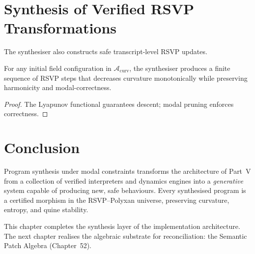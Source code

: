 \section{Synthesis of Verified RSVP Transformations}
\label{sec:51:rsvp-synthesis}

The synthesiser also constructs safe transcript-level RSVP updates.

\begin{theorem}
For any initial field configuration in $\mathcal{A}_{\mathrm{curv}}$, the
synthesiser produces a finite sequence of RSVP steps that decreases curvature
monotonically while preserving harmonicity and modal-correctness.
\end{theorem}

\begin{proof}
The Lyapunov functional guarantees descent; modal pruning enforces correctness.  
\end{proof}


\section{Conclusion}
\label{sec:51:conclusion}

Program synthesis under modal constraints transforms the architecture of Part~V
from a collection of verified interpreters and dynamics engines into a
\emph{generative} system capable of producing new, safe behaviours.
Every synthesised program is a certified morphism in the RSVP--Polyxan universe,
preserving curvature, entropy, and quine stability.

This chapter completes the synthesis layer of the implementation architecture.
The next chapter realises the algebraic substrate for reconciliation:
the Semantic Patch Algebra (Chapter~52).

